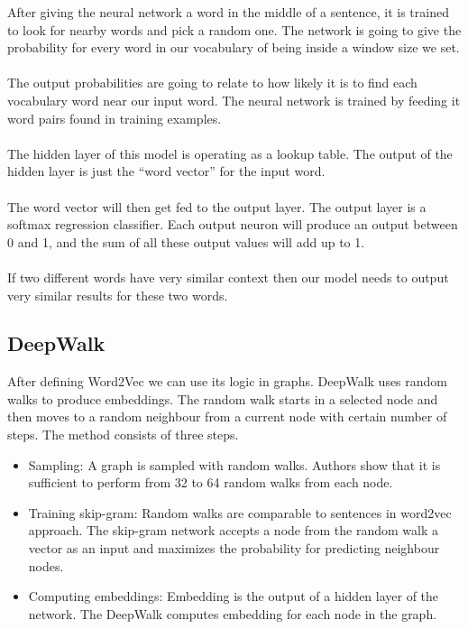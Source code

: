 \noindent After giving the neural network a word in the middle of a sentence, it is trained to look for nearby words and pick a random one. The network is going to give the probability for every word in our vocabulary of being inside a window size we set.		
 \\		
 \\		
 The output probabilities are going to relate to how likely it is to find each vocabulary word near our input word. The neural network is trained by feeding it word pairs found in training examples.		
 \\		
 \\		
 The hidden layer of this model is operating as a lookup table. The output of the hidden layer is just the “word vector” for the input word.		
 \\		
 \\		
 The word vector will then get fed to the output layer. The output layer is a softmax regression classifier. Each output neuron will produce an output between 0 and 1, and the sum of all these output values will add up to 1.		
 \\		
 \\		
 If two different words have very similar context then our model needs to output very similar results for these two words.		

 
  \subsection{DeepWalk}		

  After defining Word2Vec we can use its logic in graphs. DeepWalk uses random walks to produce embeddings. The random walk starts in a selected node and then moves to a random neighbour from a current node with certain number of steps. The method consists of three steps.		

   \begin{itemize}		
   \item Sampling: A graph is sampled with random walks. Authors show that it is sufficient to perform from 32 to 64 random walks from each node. 		

 
    \item Training skip-gram: Random walks are comparable to sentences in word2vec approach. The skip-gram network accepts a node from the random walk a vector as an input and maximizes the probability for predicting neighbour nodes. 		

    \item Computing embeddings: Embedding is the output of a hidden layer of the network. The DeepWalk computes embedding for each node in the graph.		

    \end{itemize}		

